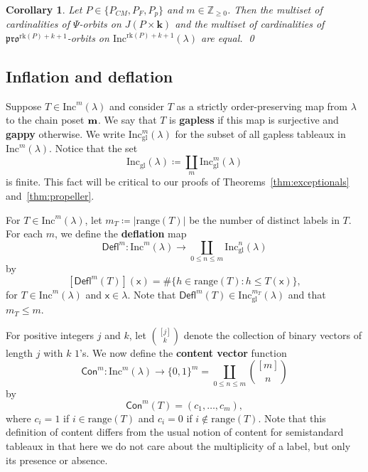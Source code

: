 \documentclass[12pt]{amsart}
\newcommand{\x}{\ensuremath{\mathsf{x}}}
\newtheorem{corollary}[theorem]{Corollary}
\theoremstyle{definition}
\theoremstyle{remark}
\numberwithin{equation}{section}
\newcommand{\inc}{\ensuremath{\mathrm{Inc}}}
\newcommand{\incgl}{\inc_{\mathrm{gl}}}
\newcommand{\pro}{\mathfrak{pro}}
\newcommand{\rank}{\ensuremath{\mathrm{rk}}}
\newcommand{\mot}{\ensuremath{\mathsf{Mot}}}
\newcommand{\deflate}{\ensuremath{\mathsf{Defl}}}
\newcommand{\content}{\ensuremath{\mathsf{Con}}}
\begin{document}
\begin{corollary}\label{cor:multisets}
Let $P \in \{ P_{CM}, P_F, P_p \}$ and $m \in \mathbb{Z}_{\geq 0}$.
Then the multiset of cardinalities of $\Psi$-orbits on $J(P \times \mathbf{k})$ and the multiset of cardinalities of $\pro^{\rank(P)+ k+1}$-orbits on $\inc^{\rank(P)+ k+1}(\lambda)$ are equal. \qed
\end{corollary}

\subsection{Inflation and deflation}
Suppose $T \in \inc^m(\lambda)$ and consider $T$ as a strictly order-preserving map from $\lambda$ to the chain poset ${\bf m}$. We say that $T$ is {\bf gapless} if this map is surjective and {\bf gappy} otherwise. We write $\incgl^m(\lambda)$ for the subset of all gapless tableaux in $\inc^m(\lambda)$. Notice that the set 
\[
\incgl(\lambda) \coloneqq \coprod_{m} \incgl^m(\lambda)
\]
is finite. This fact will be critical to our proofs of Theorems~\ref{thm:exceptionals} and~\ref{thm:propeller}.

For $T \in \inc^m(\lambda)$, let $m_T \coloneqq |\mathrm{range}(T)|$ be the number of distinct labels in $T$. For each $m$, we define the {\bf deflation} map \[\deflate^m : \inc^m(\lambda) \to \coprod_{0 \leq n \leq m} \incgl^n(\lambda)\] by
\[
[\deflate^m(T)](\x) =
\# \{ h \in \mathrm{range}(T): h \leq T(\x) \} ,
\]
for $T \in \inc^m(\lambda)$ and $\x \in \lambda$. Note that $\deflate^m(T) \in \incgl^{m_T}(\lambda)$ and that $m_T \leq m$.

For positive integers $j$ and $k$, let $\binom{[j]}{k}$ denote the collection of binary vectors of length $j$ with $k$ $1$'s. We now define the {\bf content vector} function 
\[
 \content^m : \inc^m(\lambda) \to \{ 0, 1\}^m = \coprod_{0 \leq  n \leq m} \binom{[m]}{n}
 \] 
 by 
\[
\content^m(T) = (c_1, \dots, c_m),
\] 
where $c_i = 1$ if $i \in \mathrm{range}(T)$ and $c_i = 0$ if $i \notin \mathrm{range}(T)$. Note that this definition of content differs from the usual notion of content for semistandard tableaux in that here we do not care about the multiplicity of a label, but only its presence or absence.
\end{document}
